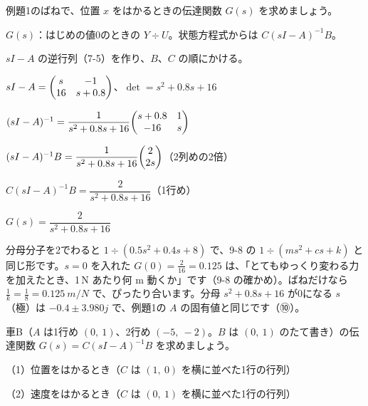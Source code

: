 \begin{reidai}[状態方程式から $G(s)$]
例題1のばねで、位置 $x$ をはかるときの伝達関数 $G(s)$ を求めましょう。
\par
\kangaekata {}\par
{}\enspace $G(s)$：はじめの値0のときの $Y\div U$。状態方程式からは $C(sI-A)^{-1}B$。\par
{}\enspace $sI-A$ の逆行列（7-5）を作り、$B$、$C$ の順にかける。\par
\shiki\kixks{}\zw{} $sI-A=\kixkpm{s&-1\\16&s+0.8}$、$\det=s^2+0.8s+16$\par
\kixka $(sI-A)^{-1}=\dfrac{1}{s^2+0.8s+16}\kixkpm{s+0.8&1\\-16&s}$\par
\kixka $(sI-A)^{-1}B=\dfrac{1}{s^2+0.8s+16}\kixkpm{2\\2s}$\quad （2列めの2倍）\par
\kixka $C(sI-A)^{-1}B=\dfrac{2}{s^2+0.8s+16}$\quad （1行め）\par
\kotae $G(s)=\dfrac{2}{s^2+0.8s+16}$
\end{reidai}

分母分子を2でわると $1\div(0.5s^2+0.4s+8)$ で、9-8 の $1\div(ms^2+cs+k)$ と同じ形です。$s=0$ を入れた $G(0)=\frac{2}{16}=0.125$ は、「とてもゆっくり変わる力を加えたとき、1\,N あたり何 m 動くか」です（9-8 の確かめ）。ばねだけなら $\frac{1}{k}=\frac{1}{8}=\qty{0.125}{m/N}$ で、ぴったり合います。分母 $s^2+0.8s+16$ が0になる $s$（極）は $-0.4\pm3.980j$ で、例題1の $A$ の固有値と同じです（⑩）。

\begin{jibun}
車B（$A$ は1行め $(0,\ 1)$、2行め $(-5,\ -2)$。$B$ は $(0,\ 1)$ のたて書き）の伝達関数 $G(s)=C(sI-A)^{-1}B$ を求めましょう。\par
（1）位置をはかるとき（$C$ は $(1,\ 0)$ を横に並べた1行の行列）\par
（2）速度をはかるとき（$C$ は $(0,\ 1)$ を横に並べた1行の行列）
\end{jibun}

